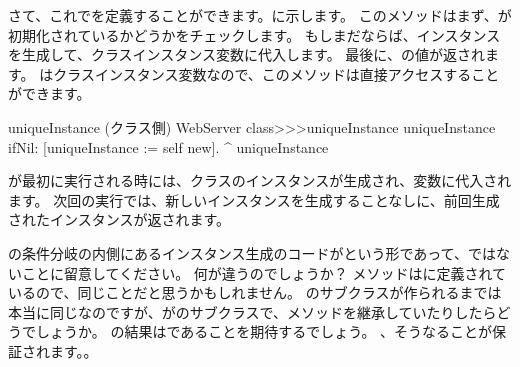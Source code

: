\documentclass[a4paper,10pt,twoside]{book}
\begin{document}
さて、これでを定義することができます。に示します。
このメソッドはまず、が初期化されているかどうかをチェックします。
もしまだならば、インスタンスを生成して、クラスインスタンス変数に代入します。
最後に、の値が返されます。
はクラスインスタンス変数なので、このメソッドは直接アクセスすることができます。
    
\begin{method}[uniqueInstance]{uniqueInstance (クラス側)}
WebServer class>>>uniqueInstance
     uniqueInstance ifNil: [uniqueInstance := self new].
     ^ uniqueInstance
\end{method}

が最初に実行される時には、クラスのインスタンスが生成され、変数に代入されます。
次回の実行では、新しいインスタンスを生成することなしに、前回生成されたインスタンスが返されます。

の条件分岐の内側にあるインスタンス生成のコードがという形であって、ではないことに留意してください。
何が違うのでしょうか？
メソッドはに定義されているので、同じことだと思うかもしれません。
のサブクラスが作られるまでは本当に同じなのですが、がのサブクラスで、メソッドを継承していたりしたらどうでしょうか。
の結果はであることを期待するでしょう。
、そうなることが保証されます。。
\end{document}
